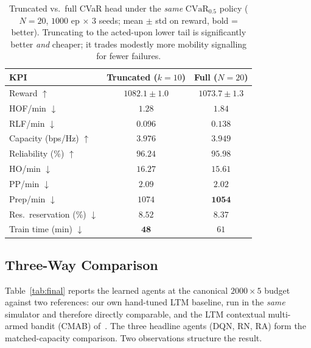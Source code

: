 \documentclass[conference]{IEEEtran}
\begin{document}
\begin{table}[htbp]
\caption{Truncated vs.\ full CVaR head under the \emph{same} $\mathrm{CVaR}_{0.5}$
policy ($N{=}20$, $1000$ ep $\times$ $3$ seeds; mean $\pm$ std on reward, bold =
better). Truncating to the acted-upon lower tail is significantly better
\emph{and} cheaper; it trades modestly more mobility signalling for fewer
failures.}
\label{tab:trunc}
\begin{center}
\begin{tabular}{|l|c|c|}
\hline
\textbf{KPI} & \textbf{Truncated ($k{=}10$)} & \textbf{Full ($N{=}20$)} \\
\hline
Reward $\uparrow$                   & $\mathbf{1082.1\pm1.0}$ & $1073.7\pm1.3$ \\
HOF/min $\downarrow$                & $\mathbf{1.28}$  & $1.84$  \\
RLF/min $\downarrow$                & $\mathbf{0.096}$ & $0.138$ \\
Capacity (bps/Hz) $\uparrow$        & $\mathbf{3.976}$ & $3.949$ \\
Reliability (\%) $\uparrow$         & $\mathbf{96.24}$ & $95.98$ \\
HO/min $\downarrow$                 & $16.27$ & $\mathbf{15.61}$ \\
PP/min $\downarrow$                 & $2.09$  & $\mathbf{2.02}$  \\
Prep/min $\downarrow$               & $1074$  & $\mathbf{1054}$  \\
Res.\ reservation (\%) $\downarrow$ & $8.52$  & $\mathbf{8.37}$  \\
Train time (min) $\downarrow$       & $\mathbf{48}$ & $61$ \\
\hline
\end{tabular}
\end{center}
\end{table}

\subsection{Three-Way Comparison}
\label{sec:results-3way}
Table~\ref{tab:final} reports the learned agents at the canonical
$2000\times5$ budget against two references: our own hand-tuned LTM baseline,
run in the \emph{same} simulator and therefore directly comparable, and the
LTM contextual multi-armed bandit (CMAB) of~\cite{cmab_ho}. The three headline
agents (DQN, RN, RA) form the matched-capacity comparison. Two observations
structure the result.
\end{document}
